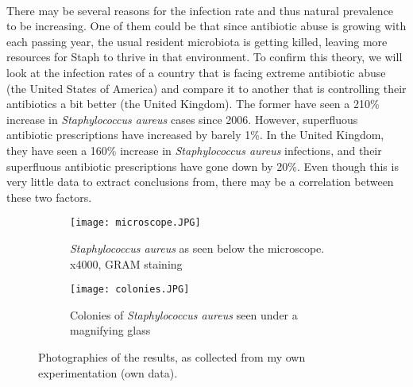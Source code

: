 \paragraph{}There may be several reasons for the infection rate and thus natural prevalence to be increasing. One of them could be that since antibiotic abuse is growing with each passing year, the usual resident microbiota is getting killed, leaving more resources for Staph to thrive in that environment. To confirm this theory, we will look at the infection rates of a country that is facing extreme antibiotic abuse (the United States of America) and compare it to another that is controlling their antibiotics a bit better (the United Kingdom). The former have seen a 210\% increase in \emph{Staphylococcus aureus} cases since 2006. However, superfluous antibiotic prescriptions have increased by barely 1\%\cite{baggsEstimatingNationalTrends2016}. In the United Kingdom, they have seen a 160\% increase in \emph{Staphylococcus aureus} infections\cite{englandMSSABacteraemiaAnnual2021}, and their superfluous antibiotic prescriptions have gone down by 20\%. Even though this is very little data to extract conclusions from, there may be a correlation between these two factors.
\begin{figure}[H]\centering\begin{subfigure}[b]{0.4\linewidth}\texttt{[image: microscope.JPG]}\caption{\emph{Staphylococcus aureus} as seen below the microscope. x4000, GRAM staining}\end{subfigure}\begin{subfigure}[b]{0.4\linewidth}\texttt{[image: colonies.JPG]}\caption{Colonies of \emph{Staphylococcus aureus} seen under a magnifying glass}\end{subfigure}\caption{Photographies of the results, as collected from my own experimentation (own data).}\end{figure}
